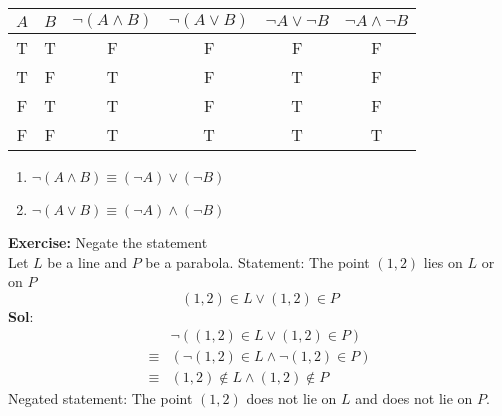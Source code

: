 \documentclass[10pt]{article}
\theoremstyle{break}
\begin{document}
\begin{table}[ht]
    \centering
    \begin{tabular}{|c|c|c|c|c|c|}
        \hline
        $A$ & $B$ & $\neg (A \wedge B)$ & $\neg (A \vee B)$ & $\neg A \vee \neg B$ & $\neg A \wedge \neg B$\\
        \hline
        T & T & F & F & F & F\\
        \hline
        T & F & T & F & T & F\\
        \hline
        F & T & T & F & T & F\\
        \hline 
        F & F & T & T & T & T\\ 
        \hline
    \end{tabular}
    \end{table}

\begin{enumerate}
    \item $\neg (A \wedge B) \equiv (\neg A) \vee (\neg B)$
    \item $\neg (A \vee B) \equiv (\neg A) \wedge (\neg B)$
\end{enumerate}
\textbf{Exercise:} Negate the statement\\ 
Let $L$ be a line and $P$ be a parabola.
Statement: The point $(1, 2)$ lies on $L$ or on $P$ $$(1,2) \in L \vee (1,2) \in P$$
\textbf{Sol}:
\begin{align*}
    &\neg ((1,2) \in L \vee (1,2) \in P)\\
    \equiv &(\neg (1,2) \in L \wedge \neg (1,2) \in P)\\
    \equiv &(1,2) \notin L \wedge (1,2) \notin P
\end{align*}
Negated statement: The point $(1,2)$ does not lie on $L$ and does not lie on $P$.
\end{document}
